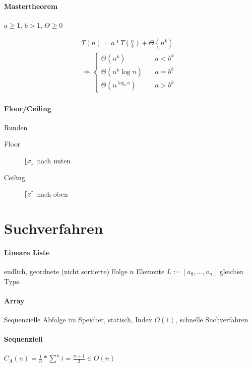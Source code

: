 \begin{mzImportant}
  \paragraph{Mastertheorem} $a \geq 1$, $b > 1$, $\Theta \geq 0$

  \begin{gather*}
    T(n) = a * T( \frac{n}{b} ) + \Theta (n^k) \\
    \Rightarrow \begin{cases}
      \Theta ( n^k ) \quad          & a < b^k \\
      \Theta ( n^k \log n ) \quad   & a = b^k \\
      \Theta ( n^{\log_b a} ) \quad & a > b^k
    \end{cases}
  \end{gather*}
\end{mzImportant}


\paragraph{Floor/Ceiling} Runden

\begin{description}
  \item [Floor] $\lfloor x\rfloor$ nach unten

  \item [Ceiling] $\lceil x\rceil$ nach oben
\end{description}

\section{Suchverfahren}

\paragraph{Lineare Liste}
endlich, geordnete (nicht sortierte) Folge $n$ Elemente $L := [a_0, \dots, a_n]$ gleichen Typs.

\paragraph{Array}
Sequenzielle Abfolge im Speicher, statisch, Index $O(1)$, schnelle Suchverfahren 

\paragraph{Sequenziell}
$C_A(n) = \frac{1}{n} * \sum^n i = \frac{n + 1}{2} \in O(n)$\

